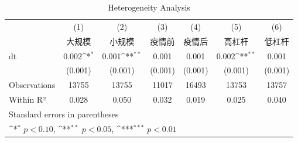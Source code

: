 \begin{table}[htbp]\centering\small
\def\sym#1{\ifmmode^{#1}\else\(^{#1}\)\fi}
\caption{Heterogeneity Analysis}
\begin{tabular}{l*{6}{c}}
\hline\hline
            &\multicolumn{1}{c}{(1)}&\multicolumn{1}{c}{(2)}&\multicolumn{1}{c}{(3)}&\multicolumn{1}{c}{(4)}&\multicolumn{1}{c}{(5)}&\multicolumn{1}{c}{(6)}\\
            &\multicolumn{1}{c}{大规模}&\multicolumn{1}{c}{小规模}&\multicolumn{1}{c}{疫情前}&\multicolumn{1}{c}{疫情后}&\multicolumn{1}{c}{高杠杆}&\multicolumn{1}{c}{低杠杆}\\
\hline
dt          &       0.002\sym{*}  &       0.001\sym{**} &       0.001         &       0.001         &       0.002\sym{**} &       0.001         \\
            &     (0.001)         &     (0.001)         &     (0.001)         &     (0.001)         &     (0.001)         &     (0.001)         \\
\hline
Observations&       13755         &       13755         &       11017         &       16493         &       13753         &       13757         \\
Within R²   &       0.028         &       0.050         &       0.032         &       0.019         &       0.025         &       0.040         \\
\hline\hline
\multicolumn{7}{l}{\footnotesize Standard errors in parentheses}\\
\multicolumn{7}{l}{\footnotesize \sym{*} \(p<0.10\), \sym{**} \(p<0.05\), \sym{***} \(p<0.01\)}\\
\end{tabular}
\end{table}
